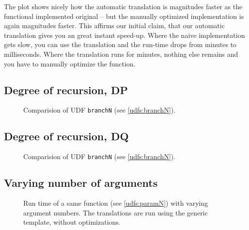 The plot shows nicely how the automatic translation is magnitudes faster as the functional implemented original -- but the manually optimized implementation is again magnitudes faster. This affirms our initial claim, that our automatic translation gives you an great instant speed-up. Where the naive implementation gets slow, you can use the translation and the run-time drops from minutes to milliseconds. Where the translation runs for minutes, nothing else remains and you have to manually optimize the function. 

\subsection{Degree of recursion, DP}

\begin{figure}[h]
    \centering
    
    \caption{Comparision of UDF \texttt{branchN} (see \autoref{udfs:branchN}).}
    \label{fig:branchN}
\end{figure}

\subsection{Degree of recursion, DQ}

\begin{figure}[h]
    \centering
    
    \caption{Comparision of UDF \texttt{branchN} (see \autoref{udfs:branchN}).}
    \label{fig:branchN}
\end{figure}


\subsection{Varying number of arguments}

\begin{figure}[h]
    \centering
    
    \caption{Run time of a same function (see \autoref{udfs:paramN}) with varying argument numbers. The translations are run using the generic template, without optimizations.}
    \label{fig:paramN}
\end{figure}

